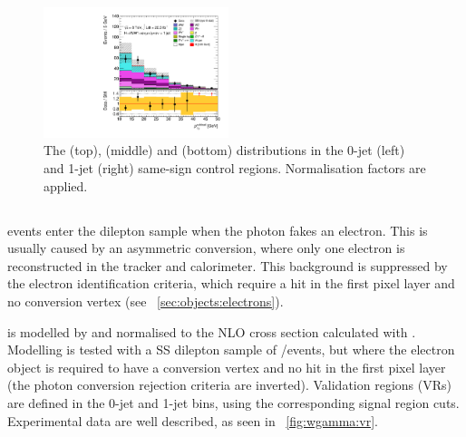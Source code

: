 \begin{figure}[p]
	\hfill
	\includegraphics[width=0.48\textwidth]{tex/backgrounds/emme_CutFRecoil_1jet_sscr_lepPtSubLead_zoom_mh125_lin}
	\caption{The \mt (top), \mll (middle) and \ptsubleadlep (bottom) distributions in the 
	0-jet (left) and 1-jet (right) same-sign control regions. Normalisation factors are 
	applied.}
	\label{fig:sscr}
\end{figure}



\subsection{\Wgamma}
\label{sec:diboson:wgamma}

\Wgamma events enter the dilepton sample when the photon fakes an electron. This is usually 
caused by an asymmetric \HepProcess{\Pphoton \HepTo \epluseminus} conversion, where only 
one electron is reconstructed in the tracker and calorimeter. This background is suppressed 
by the electron identification criteria, which require a hit in the first pixel layer and no 
conversion vertex (see \Section~\ref{sec:objects:electrons}).

\Wgamma is modelled by \meps{\alpgen}{\fherwig} and normalised to the NLO cross section 
calculated with \mcfm. Modelling is tested with a SS dilepton sample of \emch/\mech events, 
but where the electron object is required to have a conversion vertex and no hit in the 
first pixel layer (\ie the photon conversion rejection criteria are inverted). Validation 
regions (VRs) are defined in the 0-jet and 1-jet bins, using the corresponding signal 
region cuts. Experimental data are well described, as seen in \Figure~\ref{fig:wgamma:vr}.

